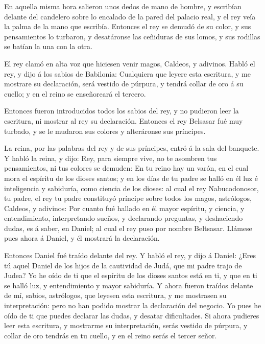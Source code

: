  En aquella misma hora salieron unos dedos de mano de
hombre, y escribían delante del candelero sobre lo encalado de la pared
del palacio real, y el rey veía la palma de la mano que escribía.
 Entonces el rey se demudó de su color, y sus pensamientos
lo turbaron, y desatáronse las ceñiduras de sus lomos, y sus rodillas se
batían la una con la otra.

 El rey clamó en alta voz que hiciesen venir magos, Caldeos,
y adivinos. Habló el rey, y dijo á los sabios de Babilonia: Cualquiera
que leyere esta escritura, y me mostrare su declaración, será vestido de
púrpura, y tendrá collar de oro á su cuello; y en el reino se
enseñoreará el tercero.

 Entonces fueron introducidos todos los sabios del rey, y no
pudieron leer la escritura, ni mostrar al rey su declaración.
 Entonces el rey Belsasar fué muy turbado, y se le mudaron
sus colores y alteráronse sus príncipes.

 La reina, por las palabras del rey y de sus príncipes,
entró á la sala del banquete. Y habló la reina, y dijo: Rey, para
siempre vive, no te asombren tus pensamientos, ni tus colores se
demuden:  En tu reino hay un varón, en el cual mora el
espíritu de los dioses santos; y en los días de tu padre se halló en él
luz é inteligencia y sabiduría, como ciencia de los dioses: al cual el
rey Nabucodonosor, tu padre, el rey tu padre constituyó príncipe sobre
todos los magos, astrólogos, Caldeos, y adivinos:  Por
cuanto fué hallado en él mayor espíritu, y ciencia, y entendimiento,
interpretando sueños, y declarando preguntas, y deshaciendo dudas, es á
saber, en Daniel; al cual el rey puso por nombre Beltsasar. Llámese pues
ahora á Daniel, y él mostrará la declaración.

 Entonces Daniel fué traído delante del rey. Y habló el
rey, y dijo á Daniel: ¿Eres tú aquel Daniel de los hijos de la
cautividad de Judá, que mi padre trajo de Judea?  Yo he
oído de ti que el espíritu de los dioses santos está en ti, y que en ti
se halló luz, y entendimiento y mayor sabiduría.  Y ahora
fueron traídos delante de mí, sabios, astrólogos, que leyesen esta
escritura, y me mostrasen su interpretación: pero no han podido mostrar
la declaración del negocio.  Yo pues he oído de ti que
puedes declarar las dudas, y desatar dificultades. Si ahora pudieres
leer esta escritura, y mostrarme su interpretación, serás vestido de
púrpura, y collar de oro tendrás en tu cuello, y en el reino serás el
tercer señor.

